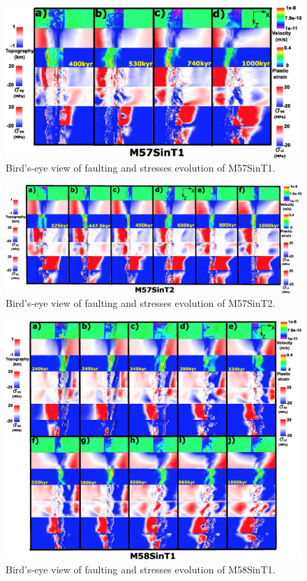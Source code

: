 \documentclass[draft,gc]{agutex}
\begin{document}
\begin{figure}[h]
\noindent\includegraphics[width=1.0\textwidth]{./Figures/fig_Results_Weakening_3_M57SinT1_time_evolution.eps}
 \caption{Bird's-eye view of faulting and stresses evolution of M57SinT1.}
\label{fig_Results_Weakenging_3}
\end{figure}

\begin{figure}[h]
\noindent\includegraphics[width=1.0\textwidth]{./Figures/fig_Results_Weakening_4_M57SinT2_time_evolution.eps}
 \caption{Bird's-eye view of faulting and stresses evolution of M57SinT2.}
\label{fig_Results_Weakenging_4}
\end{figure}

\begin{figure}[h]
\noindent\includegraphics[width=1.0\textwidth]{./Figures/fig_Results_Weakening_5_M58SinT1_time_evolution.eps}
 \caption{Bird's-eye view of faulting and stresses evolution of M58SinT1.}
\label{fig_Results_Weakenging_5}
\end{figure}
\end{document}
